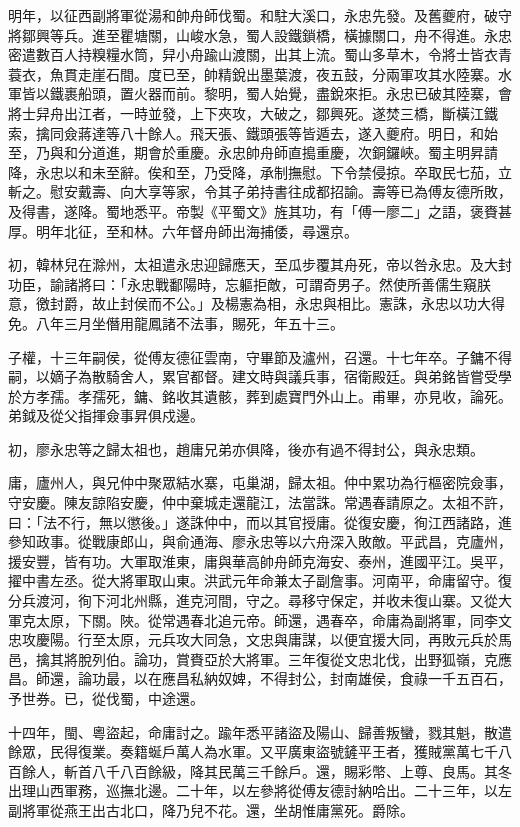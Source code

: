 \begin{pinyinscope}
明年，以征西副將軍從湯和帥舟師伐蜀。和駐大溪口，永忠先發。及舊夔府，破守將鄒興等兵。進至瞿塘關，山峻水急，蜀人設鐵鎖橋，橫據關口，舟不得進。永忠密遣數百人持糗糧水筒，舁小舟踰山渡關，出其上流。蜀山多草木，令將士皆衣青蓑衣，魚貫走崖石間。度已至，帥精銳出墨葉渡，夜五鼓，分兩軍攻其水陸寨。水軍皆以鐵裹船頭，置火器而前。黎明，蜀人始覺，盡銳來拒。永忠已破其陸寨，會將士舁舟出江者，一時並發，上下夾攻，大破之，鄒興死。遂焚三橋，斷橫江鐵索，擒同僉蔣達等八十餘人。飛天張、鐵頭張等皆遁去，遂入夔府。明日，和始至，乃與和分道進，期會於重慶。永忠帥舟師直搗重慶，次銅鑼峽。蜀主明昇請降，永忠以和未至辭。俟和至，乃受降，承制撫慰。下令禁侵掠。卒取民七茄，立斬之。慰安戴壽、向大享等家，令其子弟持書往成都招諭。壽等已為傅友德所敗，及得書，遂降。蜀地悉平。帝製《平蜀文》旌其功，有「傅一廖二」之語，褒賚甚厚。明年北征，至和林。六年督舟師出海捕倭，尋還京。

初，韓林兒在滁州，太祖遣永忠迎歸應天，至瓜步覆其舟死，帝以咎永忠。及大封功臣，諭諸將曰：「永忠戰鄱陽時，忘軀拒敵，可謂奇男子。然使所善儒生窺朕意，徼封爵，故止封侯而不公。」及楊憲為相，永忠與相比。憲誅，永忠以功大得免。八年三月坐僭用龍鳳諸不法事，賜死，年五十三。

子權，十三年嗣侯，從傅友德征雲南，守畢節及瀘州，召還。十七年卒。子鏞不得嗣，以嫡子為散騎舍人，累官都督。建文時與議兵事，宿衛殿廷。與弟銘皆嘗受學於方孝孺。孝孺死，鏞、銘收其遺骸，葬到處寶門外山上。甫畢，亦見收，論死。弟鉞及從父指揮僉事昇俱戍邊。

初，廖永忠等之歸太祖也，趙庸兄弟亦俱降，後亦有過不得封公，與永忠類。

庸，廬州人，與兄仲中聚眾結水寨，屯巢湖，歸太祖。仲中累功為行樞密院僉事，守安慶。陳友諒陷安慶，仲中棄城走還龍江，法當誅。常遇春請原之。太祖不許，曰：「法不行，無以懲後。」遂誅仲中，而以其官授庸。從復安慶，徇江西諸路，進參知政事。從戰康郎山，與俞通海、廖永忠等以六舟深入敗敵。平武昌，克廬州，援安豐，皆有功。大軍取淮東，庸與華高帥舟師克海安、泰州，進國平江。吳平，擢中書左丞。從大將軍取山東。洪武元年命兼太子副詹事。河南平，命庸留守。復分兵渡河，徇下河北州縣，進克河間，守之。尋移守保定，并收未復山寨。又從大軍克太原，下關。陜。從常遇春北追元帝。師還，遇春卒，命庸為副將軍，同李文忠攻慶陽。行至太原，元兵攻大同急，文忠與庸謀，以便宜援大同，再敗元兵於馬邑，擒其將脫列伯。論功，賞賚亞於大將軍。三年復從文忠北伐，出野狐嶺，克應昌。師還，論功最，以在應昌私納奴婢，不得封公，封南雄侯，食祿一千五百石，予世券。已，從伐蜀，中途還。

十四年，閩、粵盜起，命庸討之。踰年悉平諸盜及陽山、歸善叛蠻，戮其魁，散遣餘眾，民得復業。奏籍蜒戶萬人為水軍。又平廣東盜號鏟平王者，獲賊黨萬七千八百餘人，斬首八千八百餘級，降其民萬三千餘戶。還，賜彩幣、上尊、良馬。其冬出理山西軍務，巡撫北邊。二十年，以左參將從傅友德討納哈出。二十三年，以左副將軍從燕王出古北口，降乃兒不花。還，坐胡惟庸黨死。爵除。


\end{pinyinscope}
